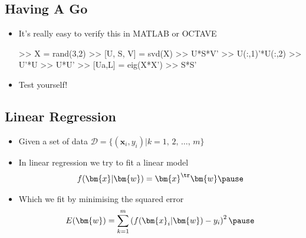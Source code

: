 \begin{slide}
\section{Having A Go}

\begin{PauseHighLight}
  \begin{itemize}
  \item It's really easy to verify this in MATLAB or OCTAVE\pause
\begin{matlab}
>> X = rand(3,2)
>> [U, S, V] = svd(X)
>> U*S*V'
>> U(:,1)'*U(:,2)
>> U'*U
>> U*U'
>> [Ua,L] = eig(X*X')
>> S*S'
\end{matlab}\pause
  \item Test yourself!\pause
  \end{itemize}
\end{PauseHighLight}

\end{slide}


\Outline %

\begin{slide}
\section{Linear Regression}

\begin{PauseHighLight}
  \begin{itemize}
  \item Given a set of data $\mathcal{D}= \{(\bm{x}_i, y_i)|k=1,\,2,\,\ldots,\, m\}$\pause
  \item In linear regression we try to fit a linear model
    \begin{align*}
      f(\bm{x}| \bm{w}) = \bm{x}^\tr \bm{w}\pause
    \end{align*}
  \item Which we fit by minimising the squared error
    \begin{align*}
      E(\bm{w}) = \sum_{k=1}^m \left(f(\bm{x}_i| \bm{w}) - y_i\right)^2\pause
    \end{align*}
  \end{itemize}
\end{PauseHighLight}

\end{slide}


